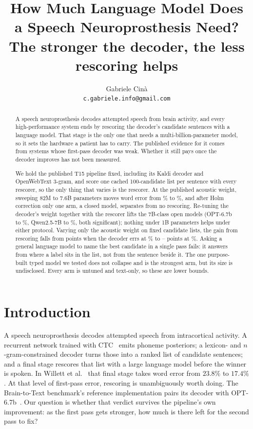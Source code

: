 \documentclass[11pt]{article}
\title{\bf How Much Language Model Does a Speech Neuroprosthesis Need?\\
\large The stronger the decoder, the less rescoring helps}
\author{Gabriele Cin\`a\\\small\texttt{c.gabriele.info@gmail.com}}
\date{}
\begin{document}
\maketitle

\begin{abstract}
\noindent
A speech neuroprosthesis decodes attempted speech from brain activity, and every
high-performance system ends by rescoring the decoder's candidate sentences with a
language model. That stage is the only one that needs a multi-billion-parameter model, so
it sets the hardware a patient has to carry. The published evidence for it comes from
systems whose first-pass decoder was weak. Whether it still pays once the decoder improves
has not been measured.

We hold the published T15 pipeline fixed, including its Kaldi decoder and OpenWebText
3-gram, and score one cached 100-candidate list per sentence with every rescorer, so the
only thing that varies is the rescorer. At the published acoustic weight, sweeping 82M to
7.6B parameters moves word error from \werNone\% to \werOpt\%, and after Holm correction
only one arm, a closed model, separates from no rescoring. Re-tuning the decoder's weight
together with the rescorer lifts the 7B-class open models (OPT-6.7b to \werOptJoint\%,
Qwen2.5-7B to \werQwenJoint\%, both significant); nothing under 1B parameters helps under
either protocol. Varying only the acoustic weight on fixed candidate lists, the gain from
rescoring falls from \gainWeak{} points when the decoder errs at \fpWeakSweep\% to
\gainStrong--\gainOptJoint{} points at \werNone\%. Asking a general language model to name
the best candidate in a single pass fails: it answers from where a label sits in the list,
not from the sentence beside it. The one purpose-built typed model we tested does not
collapse and is the strongest arm, but its size is undisclosed. Every arm is untuned and
text-only, so these are lower bounds.
\end{abstract}

\section{Introduction}

A speech neuroprosthesis decodes attempted speech from intracortical activity. A recurrent
network trained with CTC~\cite{graves2006ctc} emits phoneme posteriors; a lexicon- and
$n$-gram-constrained decoder turns those into a ranked list of candidate sentences; and a
final stage rescores that list with a large language model before the winner is spoken. In
Willett et al.~\cite{willett2023} that final stage takes word error from $23.8\%$ to
$17.4\%$. At that level of first-pass error, rescoring is unambiguously worth doing. The
Brain-to-Text benchmark's reference implementation pairs its decoder with
OPT-6.7b~\cite{zhang2022opt}. Our question is whether that verdict survives the
pipeline's own improvement: as the first pass gets stronger, how much is there left for
the second pass to fix?
\end{document}
